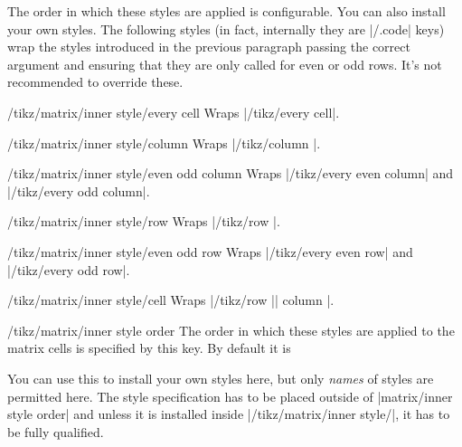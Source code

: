 The order in which these styles are applied is configurable.  You can also
install your own styles.  The following styles (in fact, internally they are
|/.code| keys) wrap the styles introduced in the previous paragraph passing the
correct argument and ensuring that they are only called for even or odd rows.
It's not recommended to override these.

\begin{stylekey}{/tikz/matrix/inner style/every cell}
    Wraps |/tikz/every cell|.
\end{stylekey}
\begin{stylekey}{/tikz/matrix/inner style/column}
    Wraps |/tikz/column |.
\end{stylekey}
\begin{stylekey}{/tikz/matrix/inner style/even odd column}
    Wraps |/tikz/every even column| and |/tikz/every odd column|.
\end{stylekey}
\begin{stylekey}{/tikz/matrix/inner style/row}
    Wraps |/tikz/row |.
\end{stylekey}
\begin{stylekey}{/tikz/matrix/inner style/even odd row}
    Wraps |/tikz/every even row| and |/tikz/every odd row|.
\end{stylekey}
\begin{stylekey}{/tikz/matrix/inner style/cell}
    Wraps |/tikz/row || column |.
\end{stylekey}

\begin{stylekey}{/tikz/matrix/inner style order}
    The order in which these styles are applied to the matrix cells is
    specified by this key.  By default it is
\begin{codeexample}
\end{codeexample}
    You can use this to install your own styles here, but only \emph{names} of
    styles are permitted here.  The style specification has to be placed
    outside of |matrix/inner style order| and unless it is installed inside
    |/tikz/matrix/inner style/|, it has to be fully qualified.
\begin{codeexample}
\end{codeexample}
\end{stylekey}


